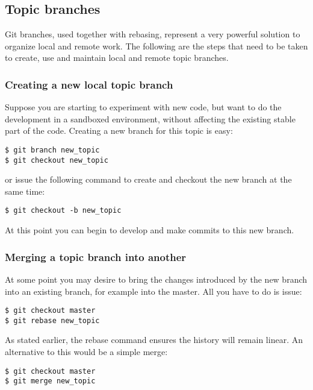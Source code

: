 \documentclass[10p]{article}
\theoremstyle{definition}
\begin{document}
\subsection*{Topic branches}

Git branches, used together with rebasing, represent a very powerful solution to organize local and remote work. The following are the steps that need to be taken to create, use and maintain local and remote topic branches.

\subsubsection*{Creating a new local topic branch}

Suppose you are starting to experiment with new code, but want to do the development in a sandboxed environment, without affecting the existing stable part of the code. Creating a new branch for this topic is easy:

\begin{lstlisting}
$ git branch new_topic
$ git checkout new_topic
\end{lstlisting}

or issue the following command to create and checkout the new branch at the same time:

\begin{lstlisting}
$ git checkout -b new_topic
\end{lstlisting}

At this point you can begin to develop and make commits to this new branch.

\subsubsection*{Merging a topic branch into another}

At some point you may desire to bring the changes introduced by the new branch into an existing branch, for example into the master. All you have to do is issue:

\begin{lstlisting}
$ git checkout master
$ git rebase new_topic
\end{lstlisting}

As stated earlier, the rebase command ensures the history will remain linear. An alternative to this would be a simple merge:

\begin{lstlisting}
$ git checkout master
$ git merge new_topic
\end{lstlisting}
\end{document}
